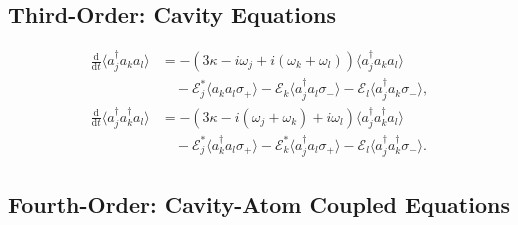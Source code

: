 \documentclass{article}
\newcommand{\ddt}[1][]{\frac{\mathrm{d} #1}{\mathrm{d}t}}
\begin{document}
\subsection{Third-Order: Cavity Equations}

\begin{subequations}
	\begin{align}
		\ddt \langle a^{\dagger}_{j} a_{k} a_{l} \rangle &= -\left( 3 \kappa - i \omega_{j} + i \left( \omega_{k} + \omega_{l} \right) \right) \langle a^{\dagger}_{j} a_{k} a_{l} \rangle \nonumber \\
		&\quad - \mathcal{E}_{j}^{*} \langle a_{k} a_{l} \sigma_{+} \rangle - \mathcal{E}_{k} \langle a^{\dagger}_{j} a_{l} \sigma_{-} \rangle - \mathcal{E}_{l} \langle a^{\dagger}_{j} a_{k} \sigma_{-} \rangle , \\
		\ddt \langle a^{\dagger}_{j} a^{\dagger}_{k} a_{l} \rangle &= -\left( 3 \kappa - i \left( \omega_{j} + \omega_{k} \right) + i \omega_{l} \right) \langle a^{\dagger}_{j} a^{\dagger}_{k} a_{l} \rangle \nonumber \\
		&\quad - \mathcal{E}_{j}^{*} \langle a^{\dagger}_{k} a_{l} \sigma_{+} \rangle - \mathcal{E}_{k}^{*} \langle a^{\dagger}_{j} a_{l} \sigma_{+} \rangle - \mathcal{E}_{l} \langle a^{\dagger}_{j} a^{\dagger}_{k} \sigma_{-} \rangle .
	\end{align}
\end{subequations}

\subsection{Fourth-Order: Cavity-Atom Coupled Equations}
\end{document}
